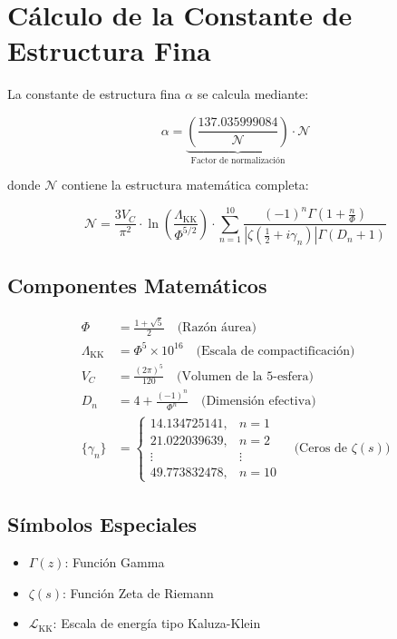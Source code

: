 \documentclass{article}
\begin{document}
\section{Cálculo de la Constante de Estructura Fina}

La constante de estructura fina $\alpha$ se calcula mediante:

\[
\alpha = \underbrace{\left(\frac{137.035999084}{\mathcal{N}}\right)}_{\text{Factor de normalización}} \cdot \mathcal{N}
\]

donde $\mathcal{N}$ contiene la estructura matemática completa:

\[
\mathcal{N} = \frac{3V_C}{\pi^2} \cdot \ln\left(\frac{\Lambda_{\text{KK}}}{\Phi^{5/2}}\right) \cdot \sum_{n=1}^{10} \frac{(-1)^n \Gamma\left(1 + \frac{n}{\Phi}\right)}{\left|\zeta\left(\frac{1}{2} + i\gamma_n\right)\right| \Gamma(D_n + 1)}
\]

\subsection*{Componentes Matemáticos}

\begin{align*}
\Phi &= \frac{1 + \sqrt{5}}{2} \quad \text{(Razón áurea)} \\
\Lambda_{\text{KK}} &= \Phi^5 \times 10^{16} \quad \text{(Escala de compactificación)} \\
V_C &= \frac{(2\pi)^5}{120} \quad \text{(Volumen de la 5-esfera)} \\
D_n &= 4 + \frac{(-1)^n}{\Phi^n} \quad \text{(Dimensión efectiva)} \\
\{\gamma_n\} &= \begin{cases} 
14.134725141, & n=1 \\
21.022039639, & n=2 \\
\vdots & \vdots \\
49.773832478, & n=10 
\end{cases} \quad \text{(Ceros de $\zeta(s)$)}
\end{align*}

\subsection*{Símbolos Especiales}
\begin{itemize}
\item $\Gamma(z)$: Función Gamma
\item $\zeta(s)$: Función Zeta de Riemann
\item $\mathscr{L}_{\text{KK}}$: Escala de energía tipo Kaluza-Klein
\end{itemize}
\end{document}
